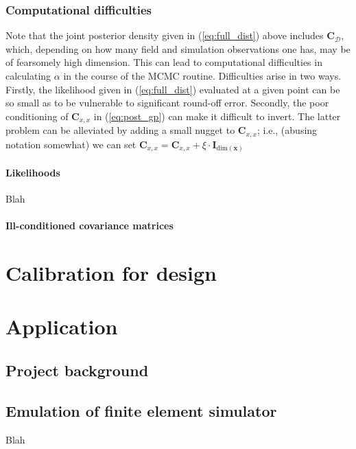 \documentclass{article}
\begin{document}

\subsubsection{Computational difficulties}
Note that the joint posterior density given in (\ref{eq:full_dist}) above includes $\mathbf C_{\mathcal D}$, which, depending on how many field and simulation observations one has, may be of fearsomely high dimension. This can lead to computational difficulties in calculating $\alpha$ in the course of the MCMC routine. Difficulties arise in two ways. Firstly, the likelihood given in (\ref{eq:full_dist}) evaluated at a given point can be so small as to be vulnerable to significant round-off error. Secondly, the poor conditioning of $\mathbf C_{x,x}$ in (\ref{eq:post_gp}) can make it difficult to invert. The latter problem can be alleviated by adding a small nugget to $\mathbf C_{x,x}$; i.e., (abusing notation somewhat) we can set $\mathbf C_{x,x}= \mathbf C_{x,x} + \xi \cdot \mathbf I_{\mathrm{dim}(\mathbf x)}$

\paragraph{Likelihoods}
Blah

\paragraph{Ill-conditioned covariance matrices}

\section{Calibration for design}



\section{Application}

\subsection{Project background}

\subsection{Emulation of finite element simulator}
Blah
\end{document}
